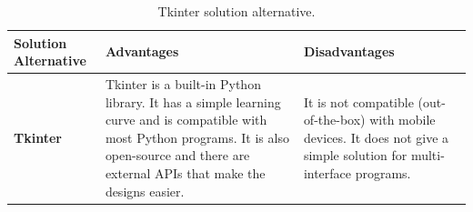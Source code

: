 \documentclass[11pt]{report} %
\begin{document}
\begin{table}[H]
\begin{center}
    \begin{tabular}{M{6.6cm}M{3.3cm}M{3.3cm}}
    \hline
    \textbf{Solution Alternative} & \textbf{Advantages} & \textbf{Disadvantages} \\ 
    \hline

    \textbf{Tkinter}
    

    \citep{cite_tkinter_official}
    
    &
    
    Tkinter is a built-in Python library. It has a simple learning curve and is compatible with most Python programs. It is also open-source and there are external APIs that make the designs easier.
    
    &
    
    It is not compatible (out-of-the-box) with mobile devices. It does not give a simple solution for multi-interface programs.
    
    \\ \hline
    \end{tabular}
\caption{\label{tab:tkinter} Tkinter solution alternative.}
\end{center}
\end{table}
\end{document}
